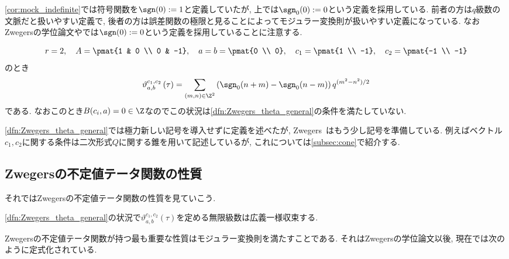 \documentclass[11pt,b5paper,oneside,lualatex]{ltjsarticle} %
\numberwithin{equation}{section} %
\begin{document}
\begin{rem}
	\cref{cor:mock_indefinite}では符号関数を$ \sgn(0) := 1 $と定義していたが, 上では$ \sgn_0(0) := 0 $という定義を採用している. 
	前者の方は$ q $級数の文脈だと扱いやすい定義で, 後者の方は誤差関数の極限と見ることによってモジュラー変換則が扱いやすい定義になっている. 
	なおZwegersの学位論文\cite{Zwegers_thesis}や\cite{BFOR}では$ \sgn(0) := 0 $という定義を採用していることに注意する. 
\end{rem}

\begin{ex}
	\[
	r = 2, \quad
	A = \pmat{1 & 0 \\ 0 & -1}, \quad
	a = b = \pmat{0 \\ 0}, \quad
	c_1= \pmat{1 \\ -1}, \quad
	c_2= \pmat{-1 \\ -1}
	\]
	のとき
	\[
	\vartheta_{a, b}^{c_1, c_2} \left( \tau \right)
	=
	\sum_{(m, n) \in \Z^2} \left( \sgn_0(n+m) - \sgn_0(n-m) \right) q^{(m^2 - n^2)/2}
	\]
	である. 
	なおこのとき$ B(c_i, a) = 0 \in \Z $なのでこの状況は\cref{dfn:Zwegers_theta_general}の条件を満たしていない. 
\end{ex}

\cref{dfn:Zwegers_theta_general}では極力新しい記号を導入せずに定義を述べたが, Zwegers~\cite{Zwegers_thesis}はもう少し記号を準備している. 
例えばベクトル$ c_1, c_2 $に関する条件は二次形式$ Q $に関する錐を用いて記述しているが, これについては\cref{subsec:cone}で紹介する. 


\subsection{Zwegersの不定値テータ関数の性質} \label{subsec:Zwegers_theta_property}


それではZwegersの不定値テータ関数の性質を見ていこう. 

\begin{thm}
	\cref{dfn:Zwegers_theta_general}の状況で$ \vartheta_{a, b}^{c_1, c_2} \left( \tau \right) $を定める無限級数は広義一様収束する. 
\end{thm}

Zwegersの不定値テータ関数が持つ最も重要な性質はモジュラー変換則を満たすことである. 
それはZwegersの学位論文以後, 現在では次のように定式化されている. 
\end{document}

